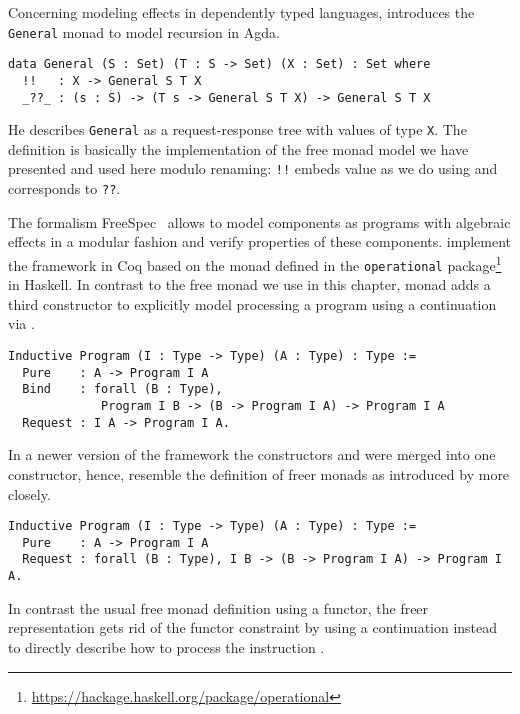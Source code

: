 Concerning modeling effects in dependently typed languages, \cite{mcbride2015turingcompleteness} introduces the \texttt{General} monad to model recursion in Agda.

\begin{verbatim}
data General (S : Set) (T : S -> Set) (X : Set) : Set where
  !!   : X -> General S T X
  _??_ : (s : S) -> (T s -> General S T X) -> General S T X
\end{verbatim}

He describes \texttt{General} as a request-response tree with values of type \texttt{X}.
The definition is basically the implementation of the free monad model we have presented and used here modulo renaming: \texttt{!!} embeds value as we do using  and  corresponds to \texttt{??}.

The formalism FreeSpec~\citep{letan2018modular} allows to model components as programs with algebraic effects in a modular fashion and verify properties of these components.
\citeauthor{letan2018modular} implement the framework in Coq based on the  monad defined in the \texttt{operational} package\footnote{\url{https://hackage.haskell.org/package/operational}} in Haskell.
In contrast to the free monad we use in this chapter,  monad adds a third constructor to explicitly model processing a program using a continuation via .

\begin{verbatim}
Inductive Program (I : Type -> Type) (A : Type) : Type :=
  Pure    : A -> Program I A
  Bind    : forall (B : Type),
             Program I B -> (B -> Program I A) -> Program I A
  Request : I A -> Program I A.
\end{verbatim}

In a newer version of the framework the constructors  and  were merged into one constructor, hence, resemble the definition of freer monads as introduced by \citet{kiselyov2015freer} more closely.

\begin{verbatim}
Inductive Program (I : Type -> Type) (A : Type) : Type :=
  Pure    : A -> Program I A
  Request : forall (B : Type), I B -> (B -> Program I A) -> Program I A.
\end{verbatim}

In contrast the usual free monad definition using a functor, the freer representation gets rid of the functor constraint by using a continuation  instead to directly describe how to process the instruction .

